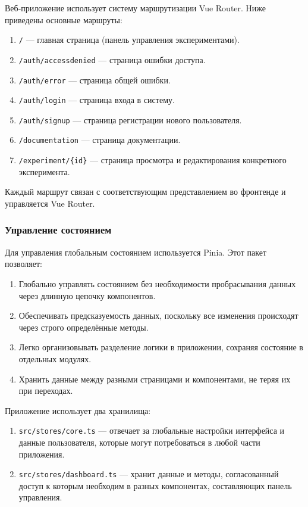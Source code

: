 Веб-приложение использует систему маршрутизации Vue Router. Ниже приведены основные маршруты:

\begin{enumerate}
    \item \texttt{/} — главная страница (панель управления экспериментами).
    \item \texttt{/auth/accessdenied} — страница ошибки доступа.
    \item \texttt{/auth/error} — страница общей ошибки.
    \item \texttt{/auth/login} — страница входа в систему.
    \item \texttt{/auth/signup} — страница регистрации нового пользователя.
    \item \texttt{/documentation} — страница документации.
    \item \texttt{/experiment/\{id\}} — страница просмотра и редактирования конкретного эксперимента.
\end{enumerate}

Каждый маршрут связан с соответствующим представлением во фронтенде и управляется Vue Router.

\subsubsection{Управление состоянием}

Для управления глобальным состоянием используется Pinia. Этот пакет позволяет:

\begin{enumerate}
    \item Глобально управлять состоянием без необходимости пробрасывания данных через длинную цепочку компонентов.
    \item Обеспечивать предсказуемость данных, поскольку все изменения происходят через строго определённые методы.
    \item Легко организовывать разделение логики в приложении, сохраняя состояние в отдельных модулях.
    \item Хранить данные между разными страницами и компонентами, не теряя их при переходах.
\end{enumerate}

Приложение использует два хранилища:

\begin{enumerate}
    \item \texttt{src/stores/core.ts} — отвечает за глобальные настройки интерфейса и данные пользователя, которые могут потребоваться в любой части приложения.
    \item \texttt{src/stores/dashboard.ts} — хранит данные и методы, согласованный доступ к которым необходим в разных компонентах, составляющих панель управления.
\end{enumerate}

